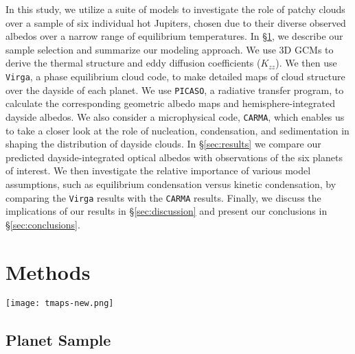 \documentclass[twocolumn]{aastex63}
\begin{document}
In this study, we utilize a suite of models to investigate the role of patchy clouds over a sample of six individual hot Jupiters, chosen due to their diverse observed albedos over a narrow range of equilibrium temperatures. In \S\ref{sec:2methods}, we describe our sample selection and summarize our modeling approach.  We use 3D GCMs to derive the thermal structure and eddy diffusion coefficients ($K_{zz}$). We then use \texttt{Virga}, a phase equilibrium cloud code, to make detailed maps of cloud structure over the dayside of each planet. We use \texttt{PICASO}, a radiative transfer program, to calculate the corresponding geometric albedo maps and hemisphere-integrated dayside albedos. We also consider a microphysical code, \texttt{CARMA}, which enables us to take a closer look at the role of nucleation, condensation, and sedimentation in shaping the distribution of dayside clouds. 
In \S\ref{sec:results} we compare our predicted dayside-integrated optical albedos with observations of the six planets of interest. We then investigate the relative importance of various model assumptions, such as equilibrium condensation versus kinetic condensation, by comparing the \texttt{Virga} results with the \texttt{CARMA} results. Finally, we discuss the implications of our results in \S\ref{sec:discussion} and present our conclusions in \S\ref{sec:conclusions}.


\section{Methods}\label{sec:2methods}

\begin{figure*}[!htb]
    \centering
    \texttt{[image: tmaps-new.png]}
    \caption{Map of the dayside temperatures (in Kelvin) of each planet at 1 mbar, roughly the pressure of unit optical depth in a clear atmosphere in the \emph{Kepler} bandpass. Each planet is given a unique scale for the color bar to best match the relevant temperature range.}
    \label{fig:tmaps}
\end{figure*}

\subsection{Planet Sample}\label{sec:sample}
\end{document}
